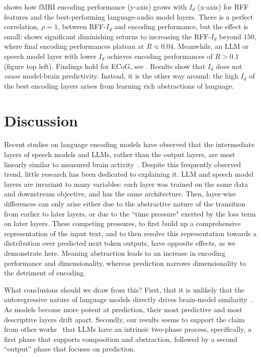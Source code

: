 \documentclass{article}
\theoremstyle{plain}
\theoremstyle{definition}
\theoremstyle{remark}
\begin{document}
 shows how fMRI encoding performance (y-axis) grows with $I_d$ (x-axis) for RFF features and the best-performing language-audio model layers. There is a perfect correlation, $\rho=1$, between RFF-$I_d$ and encoding performance, but the effect is small:  shows significant diminishing returns to increasing the RFF-$I_d$ beyond $150$, where final encoding performances plateau at $R\approx0.04$. Meanwhile, an LLM or speech model layer with lower $I_d$ achieves encoding performances of $R>0.1$ (figure top left). Findings hold for ECoG, see . Results show that $I_d$ does not \emph{cause} model-brain predictivity. Instead, it is the other way around: the high $I_d$ of the best encoding layers arises from learning rich abstractions of language.


\section{Discussion} 

Recent studies on language encoding models have observed that the intermediate layers of speech models and LLMs, rather than the output layers, are most linearly similar to measured brain activity~\cite{antonello2022predictive,Hong_2024,caucheteux2023evidence}. 
Despite this frequently observed trend, little research has been dedicated to explaining it. 
LLM and speech model layers are invariant to many variables: each layer was trained on the same data and downstream objective, and has the same architecture. Then, layer-wise differences can only arise either due to the abstractive nature of the transition from earlier to later layers, or due to the ``time pressure" exerted by the loss term on later layers. These competing pressures, to first build up a comprehensive representation of the input text, and to then resolve this representation towards a distribution over predicted next token outputs, have opposite effects, as we demonstrate here. Meaning abstraction leads to an increase in encoding performance and dimensionality, whereas prediction narrows dimensionality to the detriment of encoding. 

What conclusions should we draw from this? First, that it is unlikely  that the autoregressive nature of language models directly drives brain-model similarity~\cite{schrimpf2021neural, goldstein2022shared, antonello2022predictive}. As models become more potent at prediction, their most predictive and most descriptive layers drift apart. Secondly, our results seems to support the claim from other works~\cite{cheng2025emergence,skean2025layer,lad2025remarkable} that LLMs have an intrinsic two-phase process, specifically, a first phase that supports composition and abstraction, followed by a second ``output'' phase that focuses on prediction.%
\end{document}
